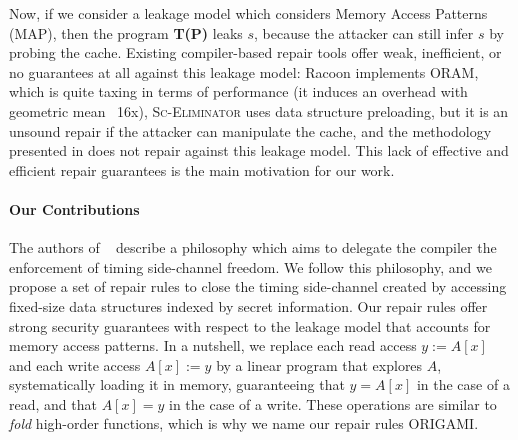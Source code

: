 Now, if we consider a leakage model which considers Memory Access Patterns (MAP), then the program \textbf{T(P)} leaks $s$, because the attacker can still infer $s$ by probing the cache. 
Existing compiler-based repair tools \cite{SCEliminator,MSESC,Racoon} offer weak, inefficient, or no guarantees at all against this leakage model: Racoon \cite{Racoon} implements ORAM, which is quite taxing in terms of performance (it induces an overhead with geometric mean ~16x), \textsc{Sc-Eliminator} uses data structure preloading, but it is an unsound repair if the attacker can manipulate the cache, and the methodology presented in \cite{MSESC} does not repair against this leakage model. %
This lack of effective and efficient repair guarantees is the main motivation for our work. 


\paragraph*{Our Contributions}
The authors of ~\cite{WhatYouCisWhatYouGet} describe a philosophy which aims to delegate the compiler the enforcement of timing side-channel freedom. We follow this philosophy, and we propose a set of repair rules to close the timing side-channel created by accessing fixed-size data structures indexed by secret information. Our repair rules offer strong security guarantees with respect to the leakage model that accounts for memory access patterns. In a nutshell, we replace each read access $y:=A[x]$ and each write access $A[x]:=y$ by a linear program that explores $A$, systematically loading it in memory, guaranteeing that $y=A[x]$ in the case of a read, and that $A[x]=y$ in the case of a write. These operations are similar to \emph{fold} high-order functions, which is why we name our repair rules ORIGAMI.

